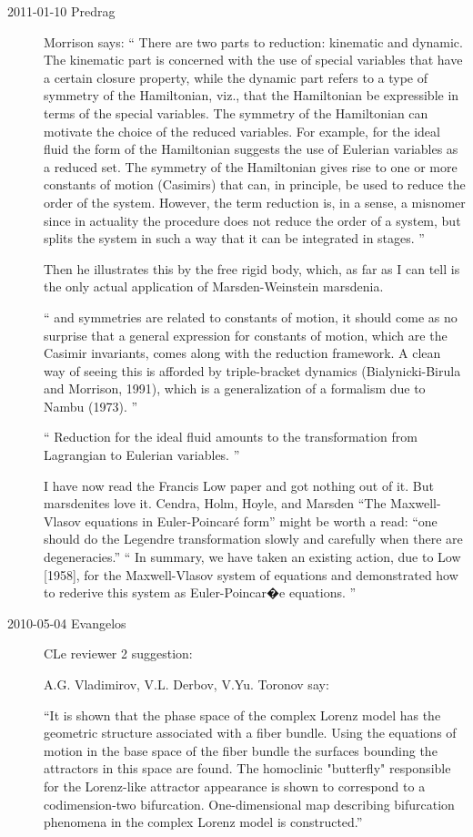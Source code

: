 \begin{description}
\item[2011-01-10 Predrag]
Morrison says:
``
There are two parts to reduction: kinematic and dynamic. The kinematic
part is concerned with the use of special variables that have a certain
closure property, while the dynamic part refers to a type of symmetry of
the Hamiltonian, viz., that the Hamiltonian be expressible in terms of
the special variables. The symmetry of the Hamiltonian can motivate the
choice of the reduced variables. For example, for the ideal fluid the
form of the Hamiltonian suggests the use of Eulerian variables as a
reduced set.
The symmetry of the Hamiltonian gives rise to one or more constants of
motion (Casimirs) that can, in principle, be used to reduce the order of
the system. However, the term reduction is, in a sense, a misnomer since
in actuality the procedure does not reduce the order of a system, but
splits the system in such a way that it can be integrated in stages.
''

Then he illustrates this by the free rigid body, which, as far as I can
tell is the only actual application of Marsden-Weinstein marsdenia.

``
and symmetries are related to constants of motion, it
should come as no surprise that a general expression for
constants of motion, which are the Casimir invariants,
comes along with the reduction framework. A clean way
of seeing this is afforded by triple-bracket dynamics
(Bialynicki-Birula and Morrison, 1991), which is a generalization
of a formalism due to Nambu (1973).
''

``
Reduction for the ideal fluid
amounts to the transformation from Lagrangian to Eulerian
variables.
''

I have now read the  Francis Low paper and got nothing out
of it. But marsdenites love it.
Cendra, Holm, Hoyle, and Marsden
``The {Maxwell-Vlasov} equations in {Euler-Poincar\'e} form'' might
be worth a read:
``one should do the Legendre transformation slowly and
carefully when there are degeneracies.''
``
In summary, we have taken an existing action, due to Low [1958], for the
Maxwell-Vlasov system of equations and demonstrated how to rederive this system
as Euler-Poincar�e equations.
''


\item[2010-05-04 Evangelos] CLe reviewer 2 suggestion:

A.G. Vladimirov, V.L. Derbov, V.Yu. Toronov
say:

``It is shown that the phase space of the complex Lorenz
model has the geometric structure associated with a fiber
bundle. Using the equations of motion in the base space of
the fiber bundle the surfaces bounding the attractors in this
space are found. The homoclinic "butterfly" responsible for
the Lorenz-like attractor appearance is shown to correspond
to a codimension-two bifurcation. One-dimensional map
describing bifurcation phenomena in the complex Lorenz model
is constructed.''


\end{description}
